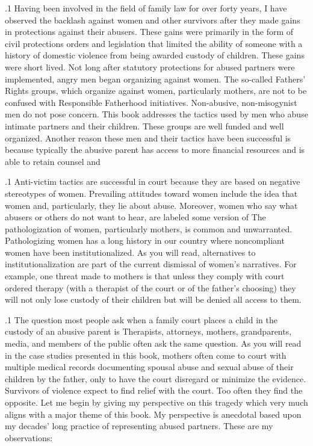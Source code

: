 \documentclass[11pt, twoside]{article}
\begin{document}
{\p.1{%
Having been involved in the field of family law for over forty years,
I have observed the backlash against women and other survivors after they made gains in protections against their abusers. These gains
were primarily in the form of civil protections orders and legislation that limited the ability of someone with a history of domestic
violence from being awarded custody of children. These gains were
short lived. Not long after statutory protections for abused partners
were implemented, angry men began organizing against women. The
so-called Fathers' Rights groups, which organize against women, particularly mothers, are not to be confused with Responsible Fatherhood
initiatives. Non-abusive, non-misogynist men do not pose concern.
This book addresses the tactics used by men who abuse intimate
partners and their children. These  groups are well
funded and well organized. Another reason these men and their tactics have been successful is because typically the abusive parent has
access to more financial resources and is able to retain counsel and
} %

\p.1{%
\enlargethispage{1em}
Anti-victim tactics are successful in court because they are based on
negative stereotypes of women. Prevailing attitudes toward women include the idea that women  and, particularly, they lie about abuse.
Moreover, women who say what abusers or others do not want to hear,
are labeled some version of  The pathologization of women, particularly mothers, is common and unwarranted. Pathologizing women
has a long history in our country where noncompliant women have been
institutionalized. As you will read, alternatives to institutionalization are
part of the current dismissal of women's narratives. For example, one
threat made to mothers is that unless they comply with court ordered
therapy (with a therapist of the court or of the father's choosing) they will
not only lose custody of their children but will be denied all access to
them.\newpage{}
} %

\p.1{%
The question most people ask when a family court places a child in the
custody of an abusive parent is  Therapists, attorneys, mothers, grandparents, media, and members of the public often
ask the same question. As you will read in the case studies presented in
this book, mothers often come to court with multiple medical records
documenting spousal abuse and sexual abuse of their children by the
father, only to have the court disregard or minimize the evidence. Survivors of violence expect to find relief with the court. Too often they
find the opposite. Let me begin by giving my perspective on this tragedy
which very much aligns with a major theme of this book. My perspective is anecdotal based upon my decades' long practice of representing
abused partners. These are my observations:
} %

}
\end{document}
